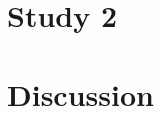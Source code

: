 \section{Study 2\label{Hardware:Study 2}}

\citep{Lederer1998}











\section{Discussion\label{Hardware:Discussion}}









